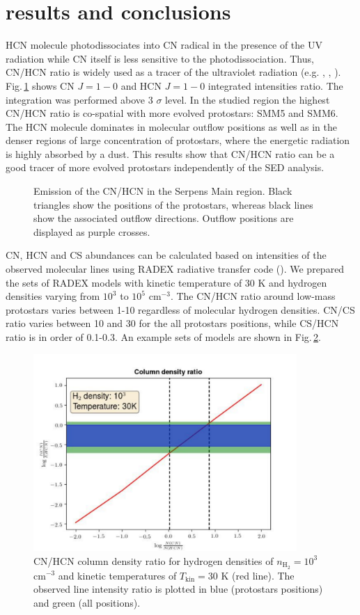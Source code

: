\documentclass[a4paper]{article}
\begin{document}
\section*{\sc results and conclusions}
\indent \indent HCN molecule photodissociates into CN radical in the presence of the UV radiation while CN itself is less sensitive to the photodissociation. Thus, CN/HCN ratio is widely used as a tracer of the ultraviolet radiation (e.g. \cite{fuente1995},  \cite{chapillon2012}, \cite{riaz2018}). Fig.\,\ref{fig1} shows CN $J=1-0$ and HCN $J=1-0$  integrated intensities ratio. The integration was performed above 3 $\sigma$ level. In the studied region the highest CN/HCN ratio is co-spatial with more evolved protostars: SMM5 and SMM6. The HCN molecule dominates in molecular outflow positions as well as in the denser regions of large concentration of protostars, where the energetic radiation is highly absorbed by a dust. This results show that CN/HCN ratio can be a good tracer of more evolved protostars independently of the SED analysis.  
\begin{figure}[!h]
\centering
{}
\caption{Emission of the CN/HCN in the Serpens Main region. Black triangles show the positions of the protostars, whereas black lines show the associated outflow directions. Outflow positions are displayed as purple crosses.}\label{fig1}
\end{figure}

\indent \indent CN, HCN and CS abundances can be calculated based on intensities of the observed molecular lines using RADEX radiative transfer code (\cite{tak2007}). We prepared the sets of RADEX models with kinetic temperature of 30 K and hydrogen densities varying from $10^3$ to $10^5$ cm$^{-3}$. The CN/HCN ratio around low-mass protostars varies between 1-10 regardless of molecular hydrogen densities. CN/CS ratio varies between 10 and 30 for the all protostars positions, while CS/HCN ratio is in order of 0.1-0.3. An example sets of models are shown in Fig.\,\ref{fig2}.

\begin{figure}[!h]
\centering
\includegraphics[height=7.5cm]{radex.pdf}
\caption{CN/HCN column density ratio for hydrogen densities of $n_\mathrm{H_2} = 10^3$ cm$^{-3}$ and kinetic temperatures of $T_\mathrm{kin} = 30$ K (red line). The observed line intensity ratio is plotted in blue (protostars positions) and green (all positions).}\label{fig2}
\end{figure}
\end{document}
